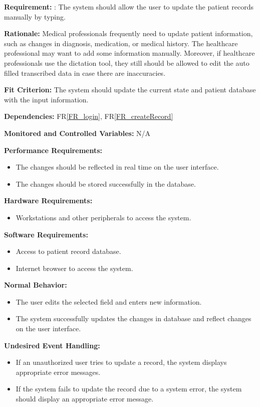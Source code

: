 \documentclass[12pt]{article}
\begin{document}
\begin{itemize}
  \textbf{Requirement:} : The system should allow the user to update the patient records manually by typing.
  
  \textbf{Rationale:} Medical professionals frequently need to update patient information, such as changes in diagnosis, medication, or medical history. The healthcare professional may want to add some information manually. Moreover, if healthcare professionals use the dictation tool, they still should be allowed to edit the auto filled transcribed data in case there are inaccuracies.
  
  \textbf{Fit Criterion:} The system should update the current state and patient database with the input information.
  
  \textbf{Dependencies:} FR\ref{FR_login}, FR\ref{FR_createRecord}
  
  \textbf{Monitored and Controlled Variables:} N/A
  
  \textbf{Performance Requirements:} 
  \begin{itemize}
    \item The changes should be reflected in real time on the user interface.
    \item The changes should be stored successfully in the database.
  \end{itemize}
  
  \textbf{Hardware Requirements:} 
  \begin{itemize}
    \item Workstations and other peripherals to access the system.
  \end{itemize}
  
  \textbf{Software Requirements:} 
  \begin{itemize}
    \item Access to patient record database.
    \item Internet browser to access the system. 
  \end{itemize}
  
  \textbf{Normal Behavior:} 
  \begin{itemize}
    \item The user edits the selected field and enters new information. 
    \item The system successfully updates the changes in database and reflect changes on the user interface. 
  \end{itemize}
  
  \textbf{Undesired Event Handling:}
  \begin{itemize}
    \item If an unauthorized user tries to update a record, the system displays appropriate error messages. 
    \item If the system fails to update the record due to a system error, the system should display an appropriate error message. 
  \end{itemize}
  

\end{itemize}
\end{document}
